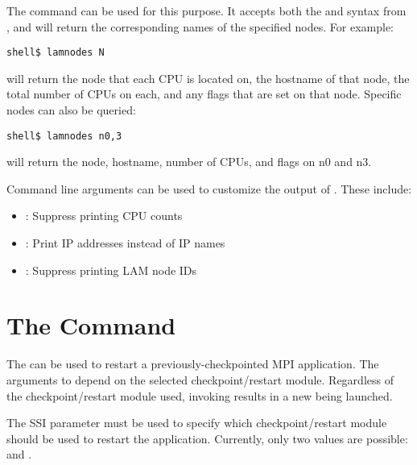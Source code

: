 The command  can be used for this purpose.  It accepts
both the  and  syntax from , and will return the
corresponding names of the specified nodes.  For example:

\lstset{style=lam-cmdline}
\begin{lstlisting}
shell$ lamnodes N
\end{lstlisting}

\noindent will return the node that each CPU is located on, the
hostname of that node, the total number of CPUs on each, and any flags
that are set on that node.  Specific nodes can also be queried:

\lstset{style=lam-cmdline}
\begin{lstlisting}
shell$ lamnodes n0,3
\end{lstlisting}

\noindent will return the node, hostname, number of CPUs, and flags on
n0 and n3.

Command line arguments can be used to customize the output of
.  These include:

\begin{itemize}
\item {}: Suppress printing CPU counts
\item {}: Print IP addresses instead of IP names
\item {}: Suppress printing LAM node IDs
\end{itemize}


\section{The  Command}

The  can be used to restart a previously-checkpointed
MPI application.  The arguments to  depend on the
selected checkpoint/restart module.  Regardless of the
checkpoint/restart module used, invoking  results in a
new  being launched.

The SSI parameter  must be used to specify which
checkpoint/restart module should be used to restart the application.
Currently, only two values are possible:  and
.

